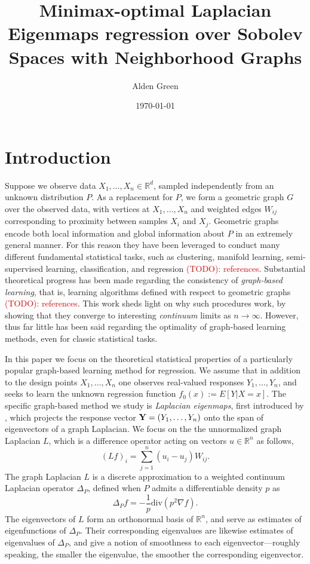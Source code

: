 \documentclass{article}
\newcommand{\Reals}{\mathbb{R}}
\newcommand{\1}{\mathbf{1}}
\theoremstyle{alden}
\theoremstyle{aldenthm}
\theoremstyle{definition}
\theoremstyle{remark}
\begin{document}
\title{Minimax-optimal Laplacian Eigenmaps regression over Sobolev Spaces with Neighborhood Graphs}
\author{Alden Green}
\date{\today}
\maketitle

\section{Introduction}
\label{sec:introduction}

Suppose we observe data $X_1,\ldots,X_n \in \Reals^d$, sampled independently from an unknown distribution $P$. As a replacement for $P$, we form a geometric graph $G$ over the observed data, with vertices at $X_1,\ldots,X_n$ and weighted edges $W_{ij}$ corresponding to proximity between samples $X_i$ and $X_j$. Geometric graphs encode both local information and global information about $P$ in an extremely general manner. For this reason they have been leveraged to conduct many different fundamental statistical tasks, such as clustering, manifold learning, semi-supervised learning, classification, and regression \textcolor{red}{(TODO): references}. Substantial theoretical progress has been made regarding the consistency of \emph{graph-based learning}, that is, learning algorithms defined with respect to geometric graphs \textcolor{red}{(TODO): references}. This work sheds light on why such procedures work, by showing that they converge to interesting \emph{continuum} limits as $n \to \infty$. However, thus far little has been said regarding the optimality of graph-based learning methods, even for classic statistical tasks. 

In this paper we focus on the theoretical statistical properties of a particularly popular graph-based learning method for regression. We assume that in addition to the design points $X_1,\ldots,X_n$ one observes real-valued responses $Y_1,\ldots,Y_n$, and seeks to learn the unknown regression function $f_0(x) := E[Y|X = x]$. The specific graph-based method we study is \emph{Laplacian eigenmaps}, first introduced by \cite{belkin03a}, which projects the response vector ${\bf Y} = (Y_1,\ldots,Y_n)$ onto the span of eigenvectors of a graph Laplacian. We focus on the the unnormalized graph Laplacian $L$, which is a difference operator acting on vectors $u \in \Reals^n$ as follows,
\begin{equation}
\label{eqn:graph_laplacian}
(Lf)_i = \sum_{j = 1}^{n} (u_i - u_j)W_{ij}. 
\end{equation}
The graph Laplacian $L$ is a discrete approximation to a weighted continuum Laplacian operator $\Delta_P$, defined when $P$ admits a differentiable density $p$ as
\begin{equation}
\label{eqn:fokker_planck_1}
\Delta_Pf= -\frac{1}{p} \mathrm{div}(p^2 \nabla f).
\end{equation}
The eigenvectors of $L$ form an orthonormal basis of $\Reals^n$, and serve as estimates of eigenfunctions of $\Delta_P$. Their corresponding eigenvalues are likewise estimates of eigenvalues of $\Delta_P$, and give a notion of smoothness to each eigenvector---roughly speaking, the smaller the eigenvalue, the smoother the corresponding eigenvector. 
\end{document}
